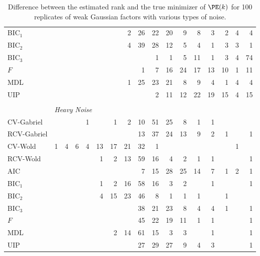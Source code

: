 \begin{table}
\begin{tabular}{lrrrrrrrrrrrrrrrr}
 BIC$_1$ &  &  &  &  &  &  &  2 &  26 &  22 &  20 &  9 &  8 &  3 &  2 &  4 &  4\\ 
 BIC$_2$ &  &  &  &  &  &  &  4 &  39 &  28 &  12 &  5 &  4 &  1 &  3 &  3 &  1\\ 
 BIC$_3$ &  &  &  &  &  &  &  &  &  1 &  1 &  5 &  11 &  1 &  3 &  4 &  74\\ 
 $F$ &  &  &  &  &  &  &  &  1 &  7 &  16 &  24 &  17 &  13 &  10 &  1 &  11\\ 
 MDL &  &  &  &  &  &  &  1 &  25 &  23 &  21 &  8 &  9 &  4 &  1 &  4 &  4\\ 
 UIP &  &  &  &  &  &  &  &  &  2 &  11 &  12 &  22 &  19 &  15 &  4 &  15\\         
        \\
        &\multicolumn{16}{l}{\scriptsize{\textit{Heavy Noise}}} \\
CV-Gabriel &  &  &  &  1 &  &  1 &  2 &  10 &  51 &  25 &  8 &  1 &  1 &  &  & \\ 
 RCV-Gabriel &  &  &  &  &  &  &  &  13 &  37 &  24 &  13 &  9 &  2 &  1 &  &  1\\ 
 CV-Wold &  1 &  4 &  6 &  4 &  13 &  17 &  21 &  32 &  1 &  &  &  &  &  &  1 & \\ 
 RCV-Wold &  &  &  &  &  1 &  2 &  13 &  59 &  16 &  4 &  2 &  1 &  1 &  &  &  1\\ 
 AIC &  &  &  &  &  &  &  &  7 &  15 &  28 &  25 &  14 &  7 &  1 &  2 &  1\\ 
 BIC$_1$ &  &  &  &  &  1 &  2 &  16 &  58 &  16 &  3 &  2 &  &  1 &  &  &  1\\ 
 BIC$_2$ &  &  &  &  &  4 &  15 &  23 &  46 &  8 &  1 &  1 &  1 &  &  1 &  & \\ 
 BIC$_3$ &  &  &  &  &  &  &  &  38 &  21 &  23 &  8 &  4 &  4 &  1 &  &  1\\ 
 $F$ &  &  &  &  &  &  &  &  45 &  22 &  19 &  11 &  1 &  1 &  &  &  1\\ 
 MDL &  &  &  &  &  &  2 &  14 &  61 &  15 &  3 &  3 &  &  1 &  &  &  1\\ 
 UIP &  &  &  &  &  &  &  &  27 &  29 &  27 &  9 &  4 &  3 &  &  &  1\\ 
        \bottomrule
    \end{tabular}
    \caption{
        Difference between the estimated rank and the true minimizer of 
        $\PE(k)$ for 100 replicates of weak Gaussian factors with various
        types of noise.
    }
\end{table}


